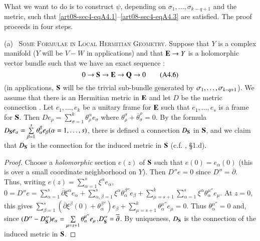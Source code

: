 What we want to do is to construct $\psi$, depending on $\sigma_{1},\ldots,\sigma_{k-q+1}$ and the metric, such that \eqref{art08-sec4-eqA4.1}--\eqref{art08-sec4-eqA4.3} are satisfied. The proof proceeds in four steps.


(a)~ \textsc{Some Formulae in Local Hermitian Geometry.} Suppose that $Y$ is a complex manifold ($Y$ will be $V-W$ in applications) and that $\mathbf{E}\to Y$ is a holomorphic vector bundle such that we have an exact sequence :
\begin{equation*}
0\to \mathbf{S}\to \mathbf{E}\to \mathbf{Q}\to 0\tag{A4.6}\label{art08-sec4-eqA4.6}
\end{equation*}
(in applications, $\mathbf{S}$ will be the trivial sub-bundle generated by $\sigma_{1},\ldots,\break \sigma_{k-q+1}$). We assume that there is an Hermitian metric in $\mathbf{E}$ and let $D$ be the metric connection \cite{art08-key11}. Let $e_{1},\ldots,e_{k}$ be a unitary frame for $\mathbf{E}$ such that $e_{1},\ldots,e_{s}$ is a frame for $\mathbf{S}$. Then $De_{\rho}=\sum\limits^{k}_{\sigma=1}\theta^{\alpha}_{\rho}e_{\sigma}$ where $\theta^{\sigma}_{\rho}+\overline{\theta}^{\rho}_{\sigma}=0$. By the formula $D_{\mathbf{S}}e_{\alpha}=\sum\limits^{s}_{\beta=1}\theta^{\beta}_{\alpha}e_{\beta}(\alpha=1,\ldots,s)$, there is defined a connection $D_{\mathbf{S}}$ in $\mathbf{S}$, and we claim that $D_{\mathbf{S}}$ is the connection for the induced metric in $\mathbf{S}$ (c.f. \cite{art08-key11}, \S1.d).

\begin{proof}
Choose a {\em holomorphic} section $e(z)$ of $\mathbf{S}$ such that $e(0)=e_{\alpha}(0)$ (this is over a small coordinate neighborhood on $Y$). Then $D''e=0$ since $D''=\overline{\partial}$. Thus, writing $e(z)=\sum\limits^{s}_{\alpha=1}\xi^{\alpha}e_{\alpha}$, $0=D''e=\sum\limits^{s}_{\alpha=1}\overline{\partial}\xi^{\alpha}e_{\alpha}+\sum\limits^{s}_{\alpha,\beta=1}\xi^{\alpha}\theta^{\beta''}_{\alpha}e_{\beta}+\sum\limits^{k}_{\mu=s+1}\sum\limits^{s}_{\alpha=1}\xi^{\alpha}\theta^{\mu''}_{\alpha}e_{\mu}$. At $z=0$, this gives $\sum\limits^{s}_{\beta=1}(\overline{\partial}\xi^{\beta}(0)+\theta^{\beta''}_{\alpha})e_{\beta}+\sum\limits^{k}_{\mu=s+1}\theta^{\mu''}_{\alpha}e_{\mu}=0$. Thus $\theta^{\mu''}_{\alpha}=0$ and, since $(D''-D''_{\mathbf{S}})e_{\alpha}=\sum\limits_{\mu=s+1}\theta^{\mu''}_{\alpha}e_{\mu}$,\pageoriginale $D''_{\mathbf{S}}=\overline{\partial}$. By uniqueness, $D_{\mathbf{S}}$ is the connection of the induced metric in $\mathbf{S}$.
\end{proof}

